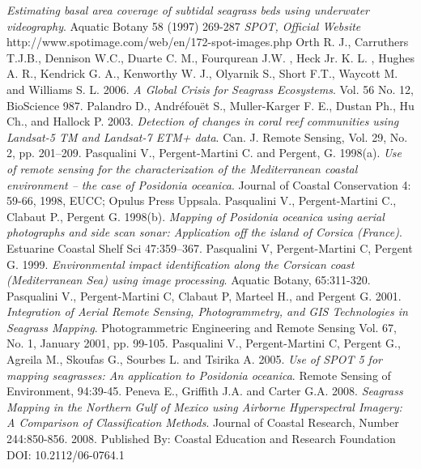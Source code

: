 \documentclass[10pt, a4paper]{article}
\begin{document}
\begin{thebibliography}{999}
\emph{Estimating basal area coverage of subtidal seagrass beds using underwater videography}.
Aquatic Botany 58 (1997) 269-287 \pageref{Noralez10}
\emph{SPOT, Official Website} http://www.spotimage.com/web/en/172-spot-images.php \pageref{SPOT}
Orth R. J., Carruthers T.J.B., Dennison W.C., Duarte C. M., Fourqurean J.W. , Heck Jr.
K. L. , Hughes A. R., Kendrick G. A., Kenworthy W. J., Olyarnik S., Short F.T., Waycott
M. and Williams S. L. 2006. \emph{A Global Crisis for Seagrass Ecosystems}. Vol. 56 No. 12,
BioScience 987. \pageref{Orth06}
Palandro D., Andréfouët S., Muller-Karger F. E., Dustan Ph., Hu Ch., and Hallock P.
2003. \emph{Detection of changes in coral reef communities using Landsat-5 TM and Landsat-7
ETM+ data}. Can. J. Remote Sensing, Vol. 29, No. 2, pp. 201–209. \pageref{Palandro03}
Pasqualini V., Pergent-Martini C. and Pergent, G. 1998(a). \emph{Use of remote sensing for the
characterization of the Mediterranean coastal environment – the case of Posidonia
oceanica}. Journal of Coastal Conservation 4: 59-66, 1998, EUCC; Opulus Press Uppsala. \pageref{Pasqualini98a}
Pasqualini V., Pergent-Martini C., Clabaut P., Pergent G. 1998(b). \emph{Mapping of
\textit{Posidonia oceanica} using aerial photographs and side scan sonar: Application off the
island of Corsica (France)}. Estuarine Coastal Shelf Sci 47:359–367. \pageref{Pasqualini98b}
Pasqualini V, Pergent-Martini C, Pergent G. 1999. \emph{Environmental impact identification
along the Corsican coast (Mediterranean Sea) using image processing}. Aquatic Botany,
65:311-320. \pageref{Pasqualini99}
Pasqualini V., Pergent-Martini C, Clabaut P, Marteel H., and Pergent G. 2001.
\emph{Integration of Aerial Remote Sensing, Photogrammetry, and GIS Technologies in Seagrass
Mapping}. Photogrammetric Engineering and Remote Sensing Vol. 67, No. 1, January 2001,
pp. 99-105. \pageref{Pasqualini01}
Pasqualini V., Pergent-Martini C, Pergent G., Agreila M., Skoufas G., Sourbes L. and
Tsirika A. 2005. \emph{Use of SPOT 5 for mapping seagrasses: An application to Posidonia
oceanica}. Remote Sensing of Environment, 94:39-45. \pageref{Pasqualini05}
Peneva E., Griffith J.A. and Carter G.A. 2008. \emph{Seagrass Mapping in the Northern Gulf
of Mexico using Airborne Hyperspectral Imagery: A Comparison of Classification Methods}.
Journal of Coastal Research, Number 244:850-856. 2008. Published By: Coastal Education
and Research Foundation DOI: 10.2112/06-0764.1 \pageref{Peneva08}

\end{thebibliography}
\end{document}
